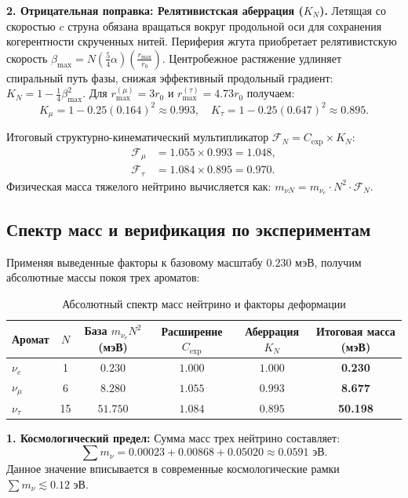 \documentclass[11pt,a4paper]{article}
\begin{document}
\textbf{2. Отрицательная поправка: Релятивистская аберрация ($K_N$).}
Летящая со скоростью $c$ струна обязана вращаться вокруг продольной оси для сохранения когерентности скрученных нитей. Периферия жгута приобретает релятивистскую скорость $\beta_{\text{max}} = N (\frac{5}{4}\alpha) (\frac{r_{\text{max}}}{r_0})$. Центробежное растяжение удлиняет спиральный путь фазы, снижая эффективный продольный градиент: $K_N = 1 - \frac{1}{4}\beta_{\text{max}}^2$.
Для $r_{\text{max}}^{(\mu)} = 3r_0$ и $r_{\text{max}}^{(\tau)} = 4.73r_0$ получаем:
\begin{equation}
	K_\mu = 1 - 0.25(0.164)^2 \approx 0.993, \quad K_\tau = 1 - 0.25(0.647)^2 \approx 0.895.
\end{equation}

Итоговый структурно-кинематический мультипликатор $\mathcal{F}_N = C_{\text{exp}} \times K_N$:
\begin{align}
	\mathcal{F}_\mu &= 1.055 \times 0.993 = \mathbf{1.048}, \\
	\mathcal{F}_\tau &= 1.084 \times 0.895 = \mathbf{0.970}.
\end{align}
Физическая масса тяжелого нейтрино вычисляется как: $m_{\nu N} = m_{\nu_e} \cdot N^2 \cdot \mathcal{F}_N$.

\subsection{Спектр масс и верификация по экспериментам}
Применяя выведенные факторы к базовому масштабу $0.230$ мэВ, получим абсолютные массы покоя трех ароматов:

\begin{table}[h]
	\centering
	\caption{Абсолютный спектр масс нейтрино и факторы деформации}
	\renewcommand{\arraystretch}{1.3}
	\begin{tabular}{lccccc}
		\toprule
		Аромат & $N$ & База $m_{\nu_e} N^2$ (мэВ) & Расширение $C_{\text{exp}}$ & Аберрация $K_N$ & Итоговая масса (мэВ) \\
		\midrule
		$\nu_e$   & 1  & $0.230$  & $1.000$ & $1.000$ & \textbf{0.230} \\
		$\nu_\mu$ & 6  & $8.280$  & $1.055$ & $0.993$ & \textbf{8.677} \\
		$\nu_\tau$ & 15 & $51.750$ & $1.084$ & $0.895$ & \textbf{50.198} \\
		\bottomrule
	\end{tabular}
\end{table}

\textbf{1. Космологический предел:}
Сумма масс трех нейтрино составляет:
\begin{equation}
	\sum m_\nu = 0.00023 + 0.00868 + 0.05020 \approx \mathbf{0.0591 \text{ эВ}}.
\end{equation}
Данное значение вписывается в современные космологические рамки $\sum m_\nu \lesssim 0.12$ эВ.
\end{document}
